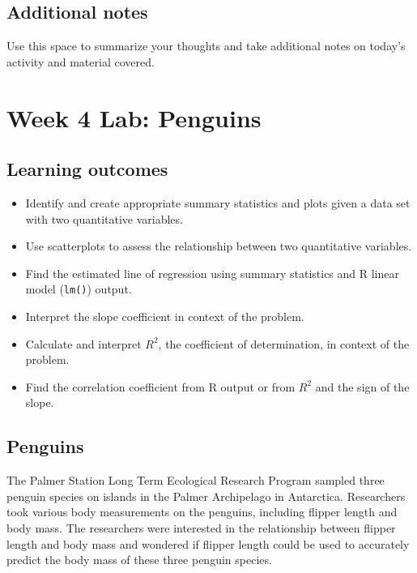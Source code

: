 \documentclass[
]{report}
\begin{document}
\hypertarget{additional-notes-6}{%
\subsection{Additional notes}\label{additional-notes-6}}

Use this space to summarize your thoughts and take additional notes on today's activity and material covered.

\newpage

\hypertarget{week-4-lab-penguins}{%
\section{Week 4 Lab: Penguins}\label{week-4-lab-penguins}}


\hypertarget{learning-outcomes-8}{%
\subsection{Learning outcomes}\label{learning-outcomes-8}}

\begin{itemize}
\item
  Identify and create appropriate summary statistics and plots
  given a data set with two quantitative variables.
\item
  Use scatterplots to assess the relationship between two quantitative variables.
\item
  Find the estimated line of regression using summary statistics and R linear model (\texttt{lm()}) output.
\item
  Interpret the slope coefficient in context of the problem.
\item
  Calculate and interpret \(R^2\), the coefficient of determination, in context of the problem.
\item
  Find the correlation coefficient from R output or from \(R^2\) and the sign of the slope.
\end{itemize}

\hypertarget{penguins}{%
\subsection{Penguins}\label{penguins}}

The Palmer Station Long Term Ecological Research Program sampled three penguin species on islands in the Palmer Archipelago in Antarctica. Researchers took various body measurements on the penguins, including flipper length and body mass. The researchers were interested in the relationship between flipper length and body mass and wondered if flipper length could be used to accurately predict the body mass of these three penguin species.
\end{document}
